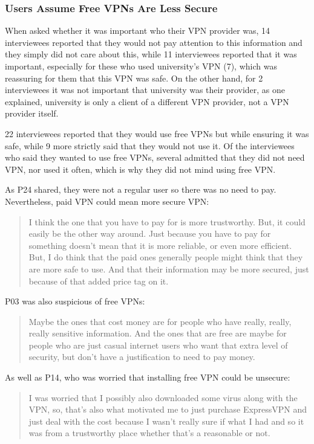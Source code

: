 \subsubsection{Users Assume Free VPNs Are Less Secure}

When asked whether it was important who their
VPN provider was, 14 interviewees reported that they would not pay attention
to this information and they simply did not care about this, while 11
interviewees reported that it was important, especially for these who used
university’s VPN (7), which was reassuring for them that this VPN was safe. On
the other hand, for 2 interviewees it was not important that university was
their provider, as one explained, university is only a client of a different
VPN provider, not a VPN provider itself. 

 22 interviewees reported that they would use free VPNs but while ensuring it was safe,
while 9 more strictly said that they would not use it. Of the interviewees who said they wanted to use free VPNs, several admitted that they did not need VPN, nor used it often, which
is why they did not mind using free VPN. 

As P24 shared, they were not a regular user so there was no need to pay.
Nevertheless, paid VPN could mean more secure VPN: \begin{quote} I think the
one that you have to pay for is more trustworthy. But, it could easily be the
other way around. Just because you have to pay for something doesn't mean that
it is more reliable, or even more efficient. But, I do think that the paid
ones generally people might think that they are more safe to use. And that
their information may be more secured, just because of that added price tag on
it.\end{quote}

P03 was also suspicious of free VPNs: \begin{quote}Maybe the ones that cost money are for people who have
really, really, really sensitive information. And the ones that are free are
maybe for people who are just casual internet users who want that extra level
of security, but don't have a justification to need to pay money. \end{quote}

As well as P14, who was worried that installing free VPN could be unsecure:
\begin{quote}I was worried that I possibly also downloaded some virus along
with the VPN, so, that's also what motivated me to just purchase ExpressVPN and
just deal with the cost because I wasn't really sure if what I had and so it
was from a trustworthy place whether that's a reasonable or not.\end{quote}

